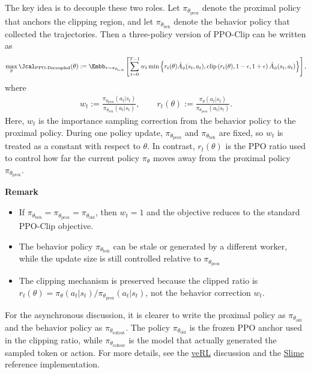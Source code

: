 The key idea is to decouple these two roles. Let $\pi_{\theta_{\text{prox}}}$ denote the proximal policy that anchors the clipping region, and let $\pi_{\theta_{\text{beh}}}$ denote the behavior policy that collected the trajectories. Then a three-policy version of PPO-Clip can be written as
\begin{align*}
    \max_{\theta}\Jcal_{\text{PPO-Decoupled}}(\theta)
    :=
    \Embb_{\tau\sim \pi_{\theta_{\text{beh}}}}
    \left[
        \sum_{t=0}^{T-1}
        w_t
        \min\left\{
            r_t(\theta)\hat A_\phi(s_t,a_t),
            \operatorname{clip}\left(r_t(\theta),1-\epsilon,1+\epsilon\right)\hat A_\phi(s_t,a_t)
        \right\}
    \right],
\end{align*}
where
\begin{align*}
    w_t
    :=
    \frac{\pi_{\theta_{\text{prox}}}(a_t|s_t)}
    {\pi_{\theta_{\text{beh}}}(a_t|s_t)},
    \qquad
    r_t(\theta)
    :=
    \frac{\pi_{\theta}(a_t|s_t)}
    {\pi_{\theta_{\text{prox}}}(a_t|s_t)}.
\end{align*}
Here, $w_t$ is the importance sampling correction from the behavior policy to the proximal policy. During one policy update, $\pi_{\theta_{\text{prox}}}$ and $\pi_{\theta_{\text{beh}}}$ are fixed, so $w_t$ is treated as a constant with respect to $\theta$. In contrast, $r_t(\theta)$ is the PPO ratio used to control how far the current policy $\pi_\theta$ moves away from the proximal policy $\pi_{\theta_{\text{prox}}}$.

\textbf{Remark}
\begin{itemize}
    \item If $\pi_{\theta_{\text{beh}}}=\pi_{\theta_{\text{prox}}}=\pi_{\theta_{\text{old}}}$, then $w_t=1$ and the objective reduces to the standard PPO-Clip objective.
    \item The behavior policy $\pi_{\theta_{\text{beh}}}$ can be stale or generated by a different worker, while the update size is still controlled relative to $\pi_{\theta_{\text{prox}}}$
    \item The clipping mechanism is preserved because the clipped ratio is $r_t(\theta)=\pi_{\theta}(a_t|s_t)/\pi_{\theta_{\text{prox}}}(a_t|s_t)$, not the behavior correction $w_t$.
\end{itemize}

For the asynchronous discussion, it is clearer to write the proximal policy as $\pi_{\theta_{\text{old}}}$ and the behavior policy as $\pi_{\theta_{\text{rollout}}}$. The policy $\pi_{\theta_{\text{old}}}$ is the frozen PPO anchor used in the clipping ratio, while $\pi_{\theta_{\text{rollout}}}$ is the model that actually generated the sampled token or action. For more details, see the \href{https://verl.readthedocs.io/en/latest/algo/rollout_corr_math.html#implementation-in-verl-the-three-policy-framework}{veRL} discussion and the \href{https://github.com/THUDM/slime}{Slime} reference implementation.


